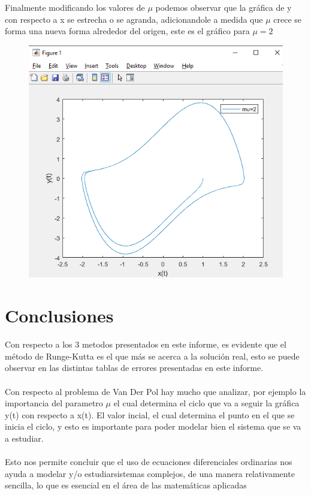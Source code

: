 \documentclass[12pt]{article}
\begin{document}
Finalmente modificando los valores de $\mu$ podemos observar que la gráfica de y con respecto a x se estrecha o se agranda, adicionandole a medida que $\mu$ crece se forma una nueva forma alrededor del origen, este es el gráfico para $\mu = 2$ 
\begin{figure}[h]
	\centering
	\caption{}
	\includegraphics[scale=0.45]{graf10.png}
	\label{graf10}
\end{figure}
\section{Conclusiones}
Con respecto a los 3 metodos presentados en este informe, es evidente que el método de Runge-Kutta es el que más se acerca a la solución real, esto se puede observar en las distintas tablas de errores presentadas en este informe.\\\\
Con respecto al problema de Van Der Pol hay mucho que analizar, por ejemplo la importancia del parametro $\mu$ el cual determina el ciclo que va a seguir la gráfica y(t) con respecto a x(t). El valor incial, el cual determina el punto en el que se inicia el ciclo, y esto es importante para poder modelar bien el sistema que se va a estudiar.\\\\
Esto nos permite concluir que el uso de ecuaciones diferenciales ordinarias nos ayuda a modelar y/o estudiarsistemas complejos, de una manera relativamente sencilla, lo que es esencial en el área de las matemáticas aplicadas
\end{document}
